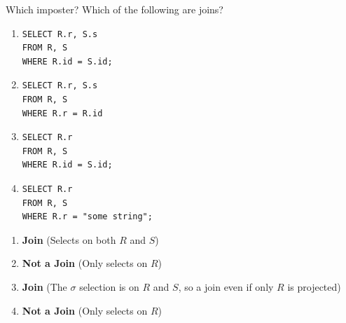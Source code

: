 \begin{examplebox}{Which imposter?}
    Which of the following are joins?
    \begin{multicols}{2}
        \begin{enumerate}
            \item {
                  \begin{verbatim}
SELECT R.r, S.s
FROM R, S
WHERE R.id = S.id;
\end{verbatim}
                  }
            \item {
                  \begin{verbatim}
SELECT R.r, S.s
FROM R, S
WHERE R.r = R.id
    \end{verbatim}
                  }
            \item {
                  \begin{verbatim}
SELECT R.r
FROM R, S
WHERE R.id = S.id;
        \end{verbatim}
                  }
            \item {
                  \begin{verbatim}
SELECT R.r
FROM R, S
WHERE R.r = "some string";
            \end{verbatim}
                  }
        \end{enumerate}
    \end{multicols}
    \tcblower
    \begin{enumerate}
        \item \textbf{Join} (Selects on both $R$ and $S$)
        \item \textbf{Not a Join} (Only selects on $R$)
        \item \textbf{Join} (The $\sigma$ selection is on $R$ and $S$, so a join even if only $R$ is projected)
        \item \textbf{Not a Join} (Only selects on $R$)
    \end{enumerate}
\end{examplebox}

